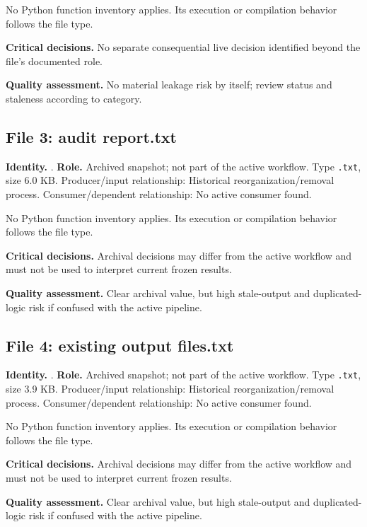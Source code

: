 \documentclass[
  11pt,
  a4paper]{article}
\begin{document}
No Python function inventory applies. Its execution or compilation
behavior follows the file type.

\textbf{Critical decisions.} No separate consequential live decision
identified beyond the file's documented role.

\textbf{Quality assessment.} No material leakage risk by itself; review
status and staleness according to category.

\subsection{File 3: audit report.txt}\label{file-2128583390372237478}

\textbf{Identity.}
.
\textbf{Role.} Archived snapshot; not part of the active workflow. Type
\texttt{.txt}, size 6.0 KB. Producer/input relationship: Historical
reorganization/removal process. Consumer/dependent relationship: No
active consumer found.

No Python function inventory applies. Its execution or compilation
behavior follows the file type.

\textbf{Critical decisions.} Archival decisions may differ from the
active workflow and must not be used to interpret current frozen
results.

\textbf{Quality assessment.} Clear archival value, but high stale-output
and duplicated-logic risk if confused with the active pipeline.

\subsection{File 4: existing output
files.txt}\label{file-6563800199376704571}

\textbf{Identity.}
.
\textbf{Role.} Archived snapshot; not part of the active workflow. Type
\texttt{.txt}, size 3.9 KB. Producer/input relationship: Historical
reorganization/removal process. Consumer/dependent relationship: No
active consumer found.

No Python function inventory applies. Its execution or compilation
behavior follows the file type.

\textbf{Critical decisions.} Archival decisions may differ from the
active workflow and must not be used to interpret current frozen
results.

\textbf{Quality assessment.} Clear archival value, but high stale-output
and duplicated-logic risk if confused with the active pipeline.
\end{document}
